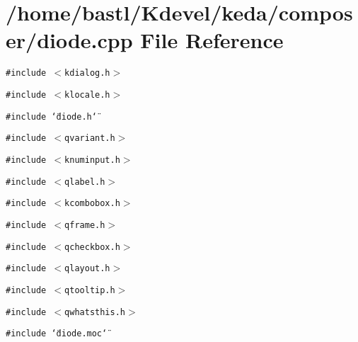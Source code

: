 \section{/home/bastl/Kdevel/keda/composer/diode.cpp File Reference}
\label{diode_8cpp}
{\tt \#include $<$kdialog.h$>$}\par
{\tt \#include $<$klocale.h$>$}\par
{\tt \#include \char`\"{}diode.h\char`\"{}}\par
{\tt \#include $<$qvariant.h$>$}\par
{\tt \#include $<$knuminput.h$>$}\par
{\tt \#include $<$qlabel.h$>$}\par
{\tt \#include $<$kcombobox.h$>$}\par
{\tt \#include $<$qframe.h$>$}\par
{\tt \#include $<$qcheckbox.h$>$}\par
{\tt \#include $<$qlayout.h$>$}\par
{\tt \#include $<$qtooltip.h$>$}\par
{\tt \#include $<$qwhatsthis.h$>$}\par
{\tt \#include \char`\"{}diode.moc\char`\"{}}\par
